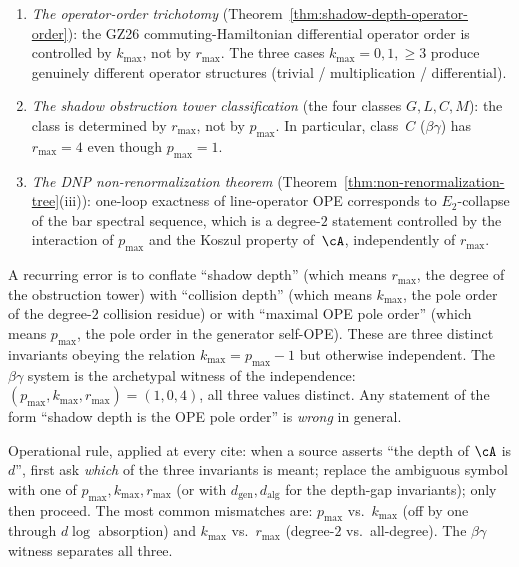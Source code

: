 \begin{enumerate}
\item \emph{The operator-order trichotomy}
 \textup{(}Theorem~\textup{\ref{thm:shadow-depth-operator-order}}\textup{)}:
 the GZ\textup{26} commuting-Hamiltonian differential operator order
 is controlled by $k_{\max}$, not by $r_{\max}$. The three cases
 $k_{\max} = 0, 1, \geq 3$ produce genuinely different
 operator structures (trivial / multiplication / differential).

\item \emph{The shadow obstruction tower classification}
 \textup{(}the four classes $G, L, C, M$\textup{)}: the class is
 determined by $r_{\max}$, not by $p_{\max}$. In particular, class~$C$
 ($\beta\gamma$) has $r_{\max} = 4$ even though $p_{\max} = 1$.

\item \emph{The DNP non-renormalization theorem}
 \textup{(}Theorem~\textup{\ref{thm:non-renormalization-tree}}(iii)\textup{)}:
 one-loop exactness of line-operator OPE corresponds to $E_2$-collapse
 of the bar spectral sequence, which is a degree-$2$ statement
 controlled by the interaction of $p_{\max}$ and the Koszul property
 of~$\cA$, independently of $r_{\max}$.
\end{enumerate}

\begin{warning}
\label{warn:three-invariants-depth-gap}
A recurring error is to
conflate ``shadow depth'' (which means $r_{\max}$, the degree of the
obstruction tower) with ``collision depth'' (which means $k_{\max}$,
the pole order of the degree-$2$ collision residue) or with
``maximal OPE pole order'' (which means $p_{\max}$, the pole order
in the generator self-OPE). These are three distinct invariants
obeying the relation $k_{\max} = p_{\max} - 1$ but otherwise
independent. The $\beta\gamma$ system is the archetypal witness
of the independence: $(p_{\max}, k_{\max}, r_{\max}) = (1, 0, 4)$,
all three values distinct. Any statement of the form ``shadow depth
is the OPE pole order'' is \emph{wrong} in general.

Operational rule, applied at every cite: when a source asserts
``the depth of $\cA$ is $d$'', first ask
\emph{which} of the three invariants is meant; replace the
ambiguous symbol with one of $p_{\max}, k_{\max}, r_{\max}$
(or with $d_{\mathrm{gen}}, d_{\mathrm{alg}}$ for the depth-gap
invariants);
only then proceed. The most common
mismatches are: $p_{\max}$ vs.\ $k_{\max}$ (off by one through
$d\log$ absorption) and $k_{\max}$ vs.\ $r_{\max}$ (degree-$2$
vs.\ all-degree). The $\beta\gamma$ witness separates all
three.
\end{warning}

